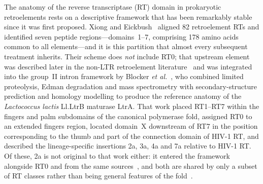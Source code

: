 The anatomy of the reverse transcriptase (RT) domain in prokaryotic retroelements rests
on a descriptive framework that has been remarkably stable since it was first proposed.
Xiong and Eickbush~\cite{xiong1990} aligned 82 retroelement RTs and identified seven
peptide regions---domains~1--7, comprising 178 amino acids common to all elements---and
it is this partition that almost every subsequent treatment inherits. Their scheme does
\emph{not} include RT0; that upstream element was described later in the non-LTR
retroelement literature~\cite{malik1999,zimmerly2001} and was integrated into the group~II
intron framework by Blocker \textit{et al.}~\cite{blocker2005}, who combined limited
proteolysis, Edman degradation and mass spectrometry with secondary-structure prediction
and homology modelling to produce the reference anatomy of the \textit{Lactococcus lactis}
Ll.LtrB maturase LtrA. That work placed RT1--RT7 within the fingers and palm subdomains of
the canonical polymerase fold, assigned RT0 to an extended fingers region, located
domain~X downstream of RT7 in the position corresponding to the thumb and part of the
connection domain of HIV-1 RT, and described the lineage-specific insertions 2a, 3a, 4a
and 7a relative to HIV-1 RT. Of these, 2a is not original to that work either: it
entered the framework alongside RT0 and from the same
sources~\cite{malik1999,zimmerly2001}, and both are shared by only a subset of RT
classes rather than being general features of the fold~\cite{simon2008}.

